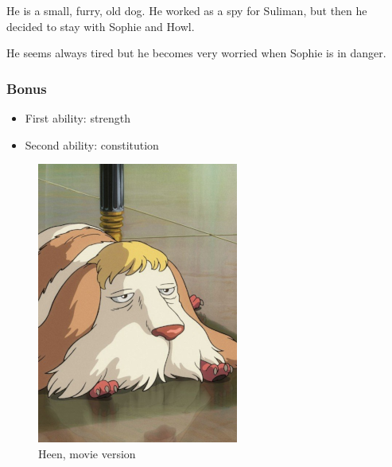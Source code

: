 \begin{minipage}[t]{0.5\textwidth}
He is a small, furry, old dog. He worked as a spy for Suliman, but then he decided to stay with Sophie and Howl.

He seems always tired but he becomes very worried when Sophie is in danger.

\subsubsection{Bonus}
\begin{itemize}
	\item First ability: strength
	\item Second ability: constitution
\end{itemize}

\end{minipage}%
%
\hfill
\begin{minipage}[t]{0.4\textwidth}
  \begin{figure}[H]
    \hfill\includegraphics{Images/Characters/heen_portrait}
    \caption{Heen, movie version}
  \end{figure}
\end{minipage}%
%
